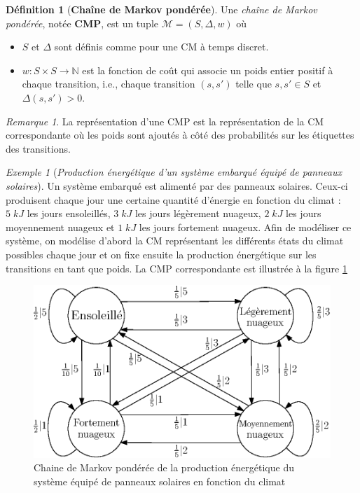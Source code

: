 \documentclass[12pt,a4paper]{report}
\theoremstyle{definition}%
\newtheorem{definition}{Définition}[chapter]
\theoremstyle{remark}
\newtheorem{example}{Exemple}[chapter]
\newtheorem{remark}{Remarque}[chapter]
\newcommand{\ie}{i.e., }
\let\labelitemi\labelitemii
\begin{document}
\begin{definition}[\textbf{Chaîne de Markov pondérée}]
	Une \textit{chaîne de Markov pondérée}, notée \textbf{CMP}, est un tuple $\mathcal{M} = (S, \Delta, w)$ où
	\begin{itemize}
		\renewcommand{\labelitemi}{\tiny$\bullet$}
		\item $S$ et $\Delta$ sont définis comme pour une CM à temps discret.
		\item $w: S\times S \rightarrow \mathbb{N}$ est la fonction de coût qui associe un poids entier positif à chaque  transition, \ie chaque transition $(s, s')$ telle que $s, s' \in S$ et $\Delta(s, s') > 0$.
	\end{itemize}
\end{definition}

\begin{remark}
	La représentation d'une CMP est la représentation de la CM correspondante où les poids sont ajoutés à côté des probabilités sur les étiquettes des transitions.
\end{remark}
\begin{example}[\textit{Production énergétique d'un système embarqué équipé de panneaux solaires}]\label{solar-pannel-example}
	Un système embarqué est alimenté par des panneaux solaires. Ceux-ci produisent chaque jour une certaine quantité d'énergie en fonction du climat : $5\; kJ$ les jours ensoleillés, $3\; kJ$ les jours légèrement nuageux, $2\; kJ$ les jours moyennement nuageux et $1\; kJ$ les jours fortement nuageux. Afin de modéliser ce système, on modélise d'abord la CM représentant les différents états du climat possibles chaque jour et on fixe ensuite la production énergétique sur les transitions en tant que poids. La CMP correspondante est illustrée à la figure \ref{solar-pannel-1}

	\begin{figure}[H]
		\centering
		\captionsetup{justification=centering}
		\includegraphics[scale=0.9]{figures/weather-solar-pannel.eps}
		\caption{Chaine de Markov pondérée de la production énergétique du système équipé de panneaux solaires en fonction du climat}
		\label{solar-pannel-1}
	\end{figure}
\end{example}
\end{document}
